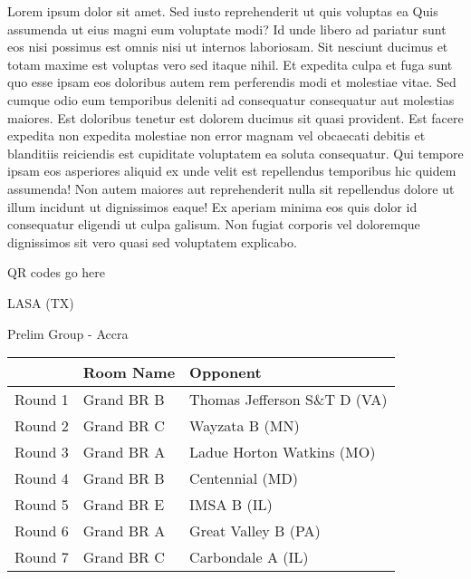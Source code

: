 \documentclass{article}%
\begin{document}
\vspace*{8pt}%
\linebreak%
\newline%
\newline%
Lorem ipsum dolor sit amet. Sed iusto reprehenderit ut quis voluptas ea Quis assumenda ut eius magni eum voluptate modi? Id unde libero ad pariatur sunt eos nisi possimus est omnis nisi ut internos laboriosam. Sit nesciunt ducimus et totam maxime est voluptas vero sed itaque nihil. Et expedita culpa et fuga sunt quo esse ipsam eos doloribus autem rem perferendis modi et molestiae vitae.\newline%
\newline%
Sed cumque odio eum temporibus deleniti ad consequatur consequatur aut molestias maiores. Est doloribus tenetur est dolorem ducimus sit quasi provident. Est facere expedita non expedita molestiae non error magnam vel obcaecati debitis et blanditiis reiciendis est cupiditate voluptatem ea soluta consequatur. Qui tempore ipsam eos asperiores aliquid ex unde velit est repellendus temporibus hic quidem assumenda!\newline%
\newline%
Non autem maiores aut reprehenderit nulla sit repellendus dolore ut illum incidunt ut dignissimos eaque! Ex aperiam minima eos quis dolor id consequatur eligendi ut culpa galisum. Non fugiat corporis vel doloremque dignissimos sit vero quasi sed voluptatem explicabo.\newline%
\newline%
%
\vspace*{30pt}%
\begin{center}%
\begin{Huge}%
QR codes go here%
\end{Huge}%
\end{center}%
\newpage%
%
\begin{center}%
\begin{Huge}%
LASA (TX)%
\end{Huge}%
\vspace*{8pt}%
\linebreak%
\begin{Large}%
Prelim Group {-} Accra%
\end{Large}%
\end{center}%
\begin{tabularx}{\textwidth}{|c|Y|Y|}%
\hline%
&Room Name&Opponent\\%
\hline%
Round 1&Grand BR B&Thomas Jefferson S\&T D (VA)\\%
Round 2&Grand BR C&Wayzata B (MN)\\%
Round 3&Grand BR A&Ladue Horton Watkins (MO)\\%
Round 4&Grand BR B&Centennial (MD)\\%
Round 5&Grand BR E&IMSA B (IL)\\%
Round 6&Grand BR A&Great Valley B (PA)\\%
Round 7&Grand BR C&Carbondale A (IL)\\%
\hline%
\end{tabularx}%
\end{document}
